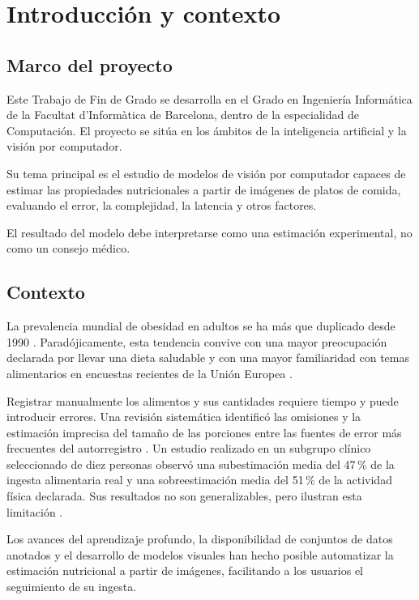 \chapter{Introducción y contexto}
\label{chap:introduccion}

\section{Marco del proyecto}

Este Trabajo de Fin de Grado se desarrolla en el Grado en Ingeniería
Informática de la Facultat d'Informàtica de Barcelona, dentro de la especialidad
de Computación. El proyecto se sitúa en los ámbitos de la inteligencia
artificial y la visión por computador.

Su tema principal es el estudio de modelos de visión por computador
capaces de estimar las propiedades nutricionales a partir de imágenes de platos de comida, evaluando el error, la complejidad,
la latencia y otros factores.

El resultado del modelo debe interpretarse como una estimación experimental, no como un consejo médico.

\section{Contexto}

La prevalencia mundial de obesidad en adultos se ha más que duplicado desde
1990 \citep{ObesityOverweight}. Paradójicamente, esta tendencia convive
con una mayor preocupación declarada por llevar una dieta saludable y con una
mayor familiaridad con temas alimentarios en encuestas recientes de la Unión
Europea \citep{2025EurobarometerFood2025}.

Registrar manualmente los alimentos y sus cantidades requiere tiempo y puede
introducir errores. Una revisión sistemática identificó las omisiones y la
estimación imprecisa del tamaño de las porciones entre las fuentes de error más
frecuentes del autorregistro \citep{whittonSystematicReviewExamining2022}. Un
estudio realizado en un subgrupo clínico seleccionado de diez personas observó
una subestimación media del 47\,\% de la ingesta alimentaria real y una
sobreestimación media del 51\,\% de la actividad física declarada. Sus resultados
no son generalizables, pero ilustran esta limitación
\citep{lichtmanDiscrepancySelfReportedActual1992}.

Los avances del aprendizaje profundo, la disponibilidad de conjuntos de datos
anotados y el desarrollo de modelos visuales han hecho posible automatizar la
estimación nutricional a partir de imágenes, facilitando a los usuarios el
seguimiento de su ingesta.

